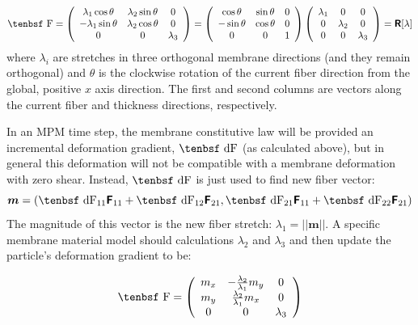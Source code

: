 \documentclass[11pt]{book}
\renewcommand{\vec}[1]{\boldsymbol{#1}}
\newcommand{\tens}[1]{\boldsymbol{\mathsf{#1}}}
\def\F{\hbox{\tenbsf F}}
\def\dF{\hbox{\tenbsf dF}}
\begin{document}
\begin{equation}
   \F = \left(\begin{array}{ccc}
          \lambda_1 \cos\theta & \lambda_2 \sin\theta & 0   \\
         -\lambda_1 \sin\theta  & \lambda_2 \cos\theta & 0   \\
        0 & 0 & \lambda_3
        \end{array}\right) = \left(\begin{array}{ccc}
         \cos\theta &  \sin\theta & 0   \\
         - \sin\theta  &  \cos\theta & 0   \\
        0 & 0 & 1
        \end{array}\right) \left(\begin{array}{ccc}
          \lambda_1 & 0 & 0   \\
         0  & \lambda_2  & 0   \\
        0 & 0 & \lambda_3
        \end{array}\right) = \tens{R}[\lambda]
\end{equation}
where $\lambda_i$ are stretches in three orthogonal membrane directions (and they remain orthogonal) and $\theta$ is the clockwise rotation of the current fiber direction from the global, positive $x$ axis direction. The first and second columns are vectors along the current fiber and thickness directions, respectively.

In an MPM time step, the membrane constitutive law will be provided an incremental deformation gradient, $\dF$ (as calculated above), but in general this deformation will not be compatible with a membrane deformation with zero shear. Instead, $\dF$ is just used to find new fiber vector:
\begin{equation}
   \vec{m} = (\dF_{11}\tens{F}_{11} + \dF_{12}\tens{F}_{21},\dF_{21}\tens{F}_{11} + \dF_{22}\tens{F}_{21})
\end{equation}
The magnitude of this vector is the new fiber stretch: $\lambda_1=||\vec{m}||$. A specific membrane material model should calculations $\lambda_2$ and $\lambda_3$ and then update the particle's deformation gradient to be:

\begin{equation}
   \F = \left(\begin{array}{ccc}
          m_x & -{\lambda_2\over\lambda_1}m_y  & 0   \\
          m_y  & {\lambda_2\over\lambda_1}m_x & 0   \\
        0 & 0 & \lambda_3
        \end{array}\right)
\end{equation}
\end{document}
